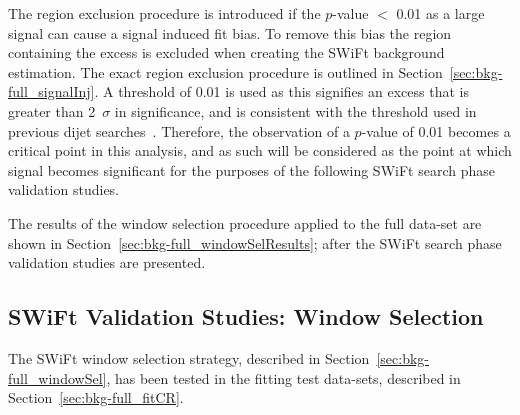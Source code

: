 The region exclusion procedure is introduced if the \bh{} \mbox{$p$-value} $<$ 0.01 as a large signal can cause a signal induced fit bias.
To remove this bias the region containing the excess is excluded when creating the SWiFt background estimation.
The exact region exclusion procedure is outlined in Section~\ref{sec:bkg-full_signalInj}.
A threshold of 0.01 is used as this signifies an excess that is greater than 2~$\sigma$ in significance,
and is consistent with the threshold used in previous dijet searches~\cite{det-thesis_kate}.
Therefore, the observation of a \bh{} \mbox{$p$-value} of 0.01 becomes a critical point in this analysis,
and as such will be considered as the point at which signal becomes significant for the purposes of the following SWiFt search phase validation studies.

The results of the window selection procedure applied to the full data-set are shown in Section~\ref{sec:bkg-full_windowSelResults};
after the SWiFt search phase validation studies are presented.



\subsection{SWiFt Validation Studies: Window Selection}
\label{sec:bkg-full_windowSelTests} 

The SWiFt window selection strategy, described in Section~\ref{sec:bkg-full_windowSel}, has been tested in the fitting test data-sets, described in Section~\ref{sec:bkg-full_fitCR}.


